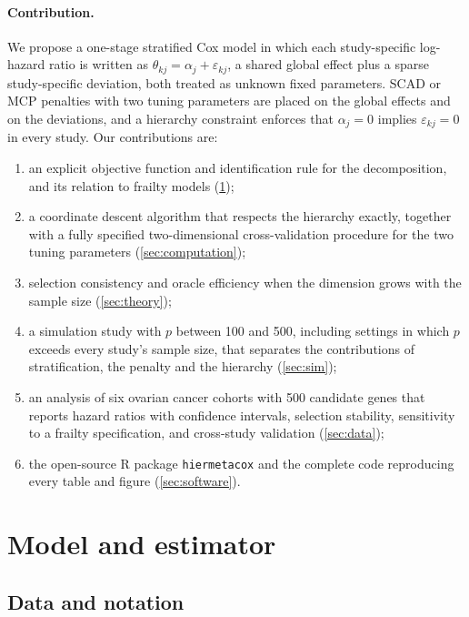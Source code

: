 \documentclass[11pt]{article}
\theoremstyle{remark}
\numberwithin{equation}{section}
\begin{document}
\paragraph{Contribution.}
We propose a one-stage stratified Cox model in which each study-specific
log-hazard ratio is written as $\theta_{kj}=\alpha_j+\varepsilon_{kj}$, a shared
global effect plus a sparse study-specific deviation, both treated as unknown
fixed parameters. SCAD or MCP penalties with two tuning parameters are placed
on the global effects and on the deviations, and a hierarchy constraint
enforces that $\alpha_j=0$ implies $\varepsilon_{kj}=0$ in every study. Our
contributions are:
\begin{enumerate}[label=(\roman*)]
  \item an explicit objective function and identification rule for the
    decomposition, and its relation to frailty models (\cref{sec:method});
  \item a coordinate descent algorithm that respects the hierarchy exactly,
    together with a fully specified two-dimensional cross-validation procedure
    for the two tuning parameters (\cref{sec:computation});
  \item selection consistency and oracle efficiency when the dimension grows
    with the sample size (\cref{sec:theory});
  \item a simulation study with $p$ between 100 and 500, including settings in
    which $p$ exceeds every study's sample size, that separates the
    contributions of stratification, the penalty and the hierarchy
    (\cref{sec:sim});
  \item an analysis of six ovarian cancer cohorts with 500 candidate genes that
    reports hazard ratios with confidence intervals, selection stability,
    sensitivity to a frailty specification, and cross-study validation
    (\cref{sec:data});
  \item the open-source R package \texttt{hiermetacox} and the complete code
    reproducing every table and figure (\cref{sec:software}).
\end{enumerate}

\section{Model and estimator}
\label{sec:method}

\subsection{Data and notation}
\label{subsec:notation}
\end{document}
